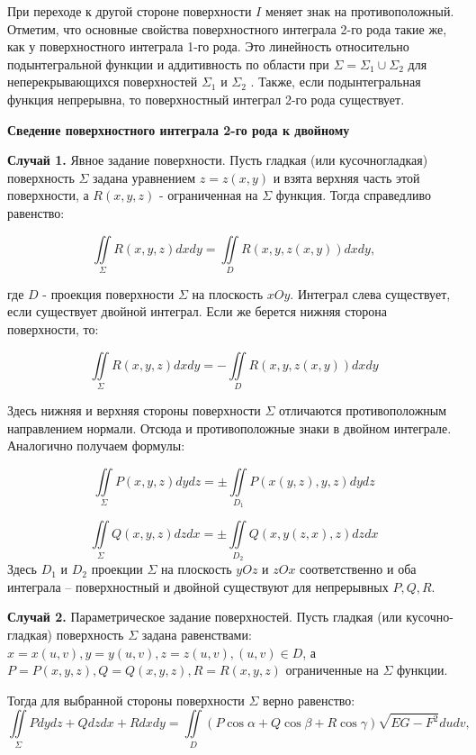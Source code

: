 При переходе к другой стороне поверхности $I$ меняет знак на противоположный. Отметим, что основные
свойства поверхностного интеграла 2-го рода такие же, как у поверхностного
интеграла 1-го рода. Это линейность относительно подынтегральной функции 
и аддитивность по области при $\Sigma=\Sigma_1\cup \Sigma_2$ для неперекрывающихся поверхностей $\Sigma_1$ и $\Sigma_2$ . Также, если подынтегральная функция непрерывна, то поверхностный интеграл 2-го рода существует.

\begin{center}
	\textbf{Сведение поверхностного интеграла 2-го рода к двойному}
\end{center}

\textbf{Случай 1.} Явное задание поверхности. Пусть гладкая (или кусочногладкая) поверхность $\Sigma$ задана уравнением $z = z(x, y)$ и взята верхняя часть
этой поверхности, а $R(x, y,z)$ - ограниченная на $\Sigma$ функция. Тогда справедливо равенство:

$$\iint\limits_\Sigma R(x, y, z)dxdy = \iint\limits_D R(x, y, z(x, y))dxdy,$$

где $D$ - проекция поверхности $\Sigma$ на плоскость $xOy$. Интеграл слева существует, если существует двойной интеграл. Если же берется нижняя сторона поверхности, то:

$$\iint\limits_\Sigma R(x, y,z)dxdy = - \iint\limits_D R(x, y, z(x, y))dxdy$$

Здесь нижняя и верхняя стороны поверхности $\Sigma$ отличаются противоположным направлением нормали. Отсюда и противоположные знаки в двойном интеграле. Аналогично получаем формулы:

$$\iint\limits_\Sigma P(x, y,z)dydz = \pm \iint\limits_{D_1} P(x(y,z), y, z)dydz$$

$$\iint\limits_\Sigma Q(x, y,z)dzdx = \pm \iint\limits_{D_2} Q(x, y(z,x), z)dzdx$$
Здесь $D_1$ и $D_2$ проекции $\Sigma$ на плоскость $yOz$ и $zOx$ соответственно и оба интеграла – поверхностный и двойной существуют для непрерывных $P,Q, R$.

\par\bigskip

\textbf{Случай 2.} Параметрическое задание поверхностей. Пусть гладкая (или
кусочно-гладкая) поверхность  $\Sigma$ задана равенствами:
$x = x(u, v), y = y(u, v), z = z(u, v), (u, v) \in D$,
а $P = P(x, y, z), Q = Q(x, y, z), R = R(x, y, z)$ ограниченные на  $\Sigma$ функции.

Тогда для выбранной стороны поверхности  $\Sigma$ верно равенство:
$$\iint\limits_\Sigma Pdydz+Qdzdx+Rdxdy = \iint\limits_D (P\cos\alpha + Q\cos\beta + R\cos\gamma)\sqrt{EG-F^2} dudv,$$

